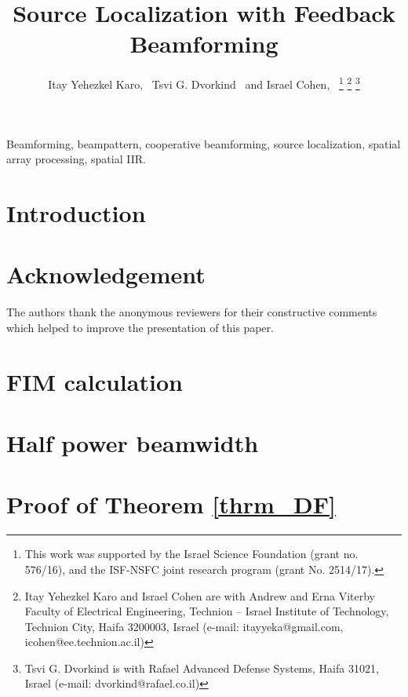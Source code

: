 \documentclass[journal]{IEEEtran}
\begin{document}
\title{Source Localization with Feedback Beamforming}
\author{Itay Yehezkel Karo,~\IEEEmembership{}
        Tsvi G. Dvorkind~\IEEEmembership{}
        and 
        Israel Cohen,~
\thanks{This work was supported by the Israel Science Foundation (grant no. 576/16), and the ISF-NSFC joint research program (grant No. 2514/17).}
\thanks{Itay Yehezkel Karo and Israel Cohen are with Andrew and Erna Viterby Faculty of Electrical Engineering, Technion -- Israel Institute of Technology, Technion City, Haifa 3200003, Israel (e-mail: itayyeka@gmail.com, icohen@ee.technion.ac.il)}%
\thanks{Tsvi G. Dvorkind is with Rafael Advanced Defense Systems, Haifa 31021, Israel (e-mail: dvorkind@rafael.co.il)}%
}
\markboth{}%
{}
\maketitle
\begin{abstract}

\end{abstract}
\begin{IEEEkeywords}
Beamforming, beampattern, cooperative beamforming, source localization, spatial array processing, spatial IIR.
\end{IEEEkeywords}
\section{Introduction}





\section*{Acknowledgement}
The authors thank the anonymous reviewers for their constructive comments which helped to improve the presentation of this paper.

\appendices
\section{FIM calculation}
\label{apdx_clacFim}

\section{Half power beamwidth}
\label{apdx_HPBW}

\section{Proof of Theorem \ref{thrm_DF}}
\label{apdx_thrm_DF}

\ifCLASSOPTIONcaptionsoff
  \newpage
\fi




\end{document}
